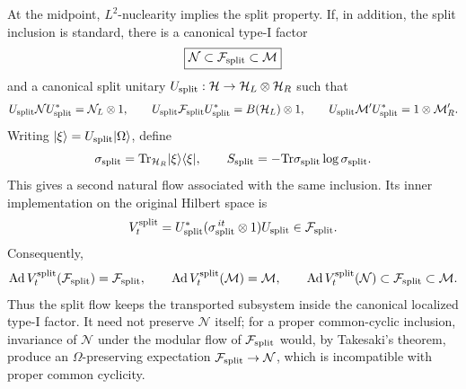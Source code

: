 \documentclass[a4paper,11pt]{article}
\theoremstyle{definition}
\newcommand{\Tr}{\text{Tr}}
\newcommand{\mN}{\mathcal{N}}
\newcommand{\mM}{\mathcal{M}}
\newcommand{\Ad}{\operatorname{Ad}}
\begin{document}
At the midpoint, $L^2$-nuclearity implies the split property. If, in addition,
the split inclusion is standard, there is a canonical type-I factor
\begin{equation}
    \boxed{
    \mN\subset\mathcal F_{\rm split}\subset\mM
    }
    \label{eq:canonical-split-factor}
\end{equation}
and a canonical split unitary
$U_{\rm split}:\mathcal H\to\mathcal H_L\otimes\mathcal H_R$ such that
\begin{equation}
    U_{\rm split}\mN U_{\rm split}^*
    =\mN_L\otimes1,
    \qquad
    U_{\rm split}\mathcal F_{\rm split}U_{\rm split}^*
    =B(\mathcal H_L)\otimes1,
    \qquad
    U_{\rm split}\mM'U_{\rm split}^*
    =1\otimes\mM_R'.
    \label{eq:canonical-split-representation}
\end{equation}
Writing $|\xi\rangle=U_{\rm split}|\Omega\rangle$, define
\begin{equation}
    \sigma_{\rm split}
    =\Tr_{\mathcal H_R}|\xi\rangle\langle\xi|,
    \qquad
    S_{\rm split}=-\Tr\sigma_{\rm split}\log\sigma_{\rm split}.
    \label{eq:sigma-split-definition}
\end{equation}
This gives a second natural flow associated with the same inclusion. Its inner
implementation on the original Hilbert space is
\begin{equation}
    V_t^{\rm split}
    =U_{\rm split}^*
      (\sigma_{\rm split}^{\,it}\otimes1)
      U_{\rm split}
    \in\mathcal F_{\rm split}.
    \label{eq:split-inner-dynamics}
\end{equation}
Consequently,
\begin{equation}
    \Ad V_t^{\rm split}(\mathcal F_{\rm split})
    =\mathcal F_{\rm split},
    \qquad
    \Ad V_t^{\rm split}(\mM)=\mM,
    \qquad
    \Ad V_t^{\rm split}(\mN)
    \subset\mathcal F_{\rm split}\subset\mM.
    \label{eq:split-dynamics-localized}
\end{equation}
Thus the split flow keeps the transported subsystem inside the canonical
localized type-I factor. It need not preserve $\mN$ itself; for a
proper common-cyclic inclusion, invariance of $\mN$ under the modular
flow of $\mathcal F_{\rm split}$ would, by Takesaki's theorem, produce an
$\Omega$-preserving expectation $\mathcal F_{\rm split}\to\mN$, which
is incompatible with proper common cyclicity.
\end{document}
